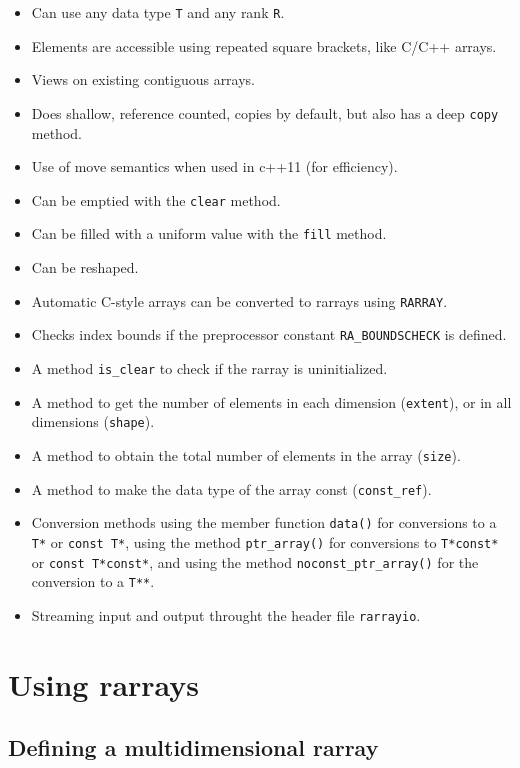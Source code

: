 \documentclass[11pt,twoside]{article}
\begin{document}
\begin{itemize}\itemsep0pt\parskip2pt
\item Can use any data type {\tt T} and any rank {\tt R}.
\item Elements are accessible using repeated square brackets, like C/C++ arrays.
\item Views on existing contiguous arrays.
\item Does shallow, reference counted, copies by default, but also has a deep {\tt copy}
  method.
\item Use of move semantics when used in c++11 (for efficiency).
\item Can be emptied with the {\tt clear} method.
\item Can be filled with a uniform value with the {\tt fill} method.
\item Can be reshaped.
\item Automatic C-style arrays can be converted to rarrays using {\tt RARRAY}.
\item Checks index bounds if the preprocessor
  constant {\tt RA\_BOUNDSCHECK} is defined. 
\item A method {\tt is\_clear} to check if the rarray is uninitialized.
\item A method to get the number of elements in each
  dimension (\texttt{extent}), or in all dimensions (\texttt{shape}).
\item A method to obtain the total number of elements in the
  array (\texttt{size}).
\item A method to make the data type of the array const
  (\texttt{const\_ref}).
\item Conversion methods using the member
  function \texttt{data()} for conversions to a \texttt{T*} or
  \texttt{const T*}, using the method \texttt{ptr\_array()} for
  conversions to \texttt{T*const*} or \texttt{const T*const*}, and
  using the method \texttt{noconst\_ptr\_array()} for the conversion to a
  \texttt{T**}.
\item Streaming input and output throught the header file \texttt{rarrayio}.
\end{itemize}

\section{Using rarrays}

\subsection{Defining a multidimensional rarray}
\end{document}
